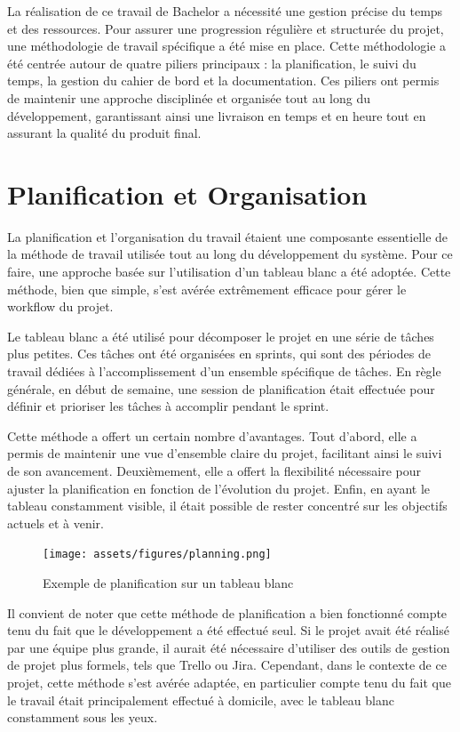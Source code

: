 La réalisation de ce travail de Bachelor a nécessité une gestion précise du temps et des ressources. Pour assurer une progression régulière et structurée du projet, une méthodologie de travail spécifique a été mise en place. Cette méthodologie a été centrée autour de quatre piliers principaux : la planification, le suivi du temps, la gestion du cahier de bord et la documentation. Ces piliers ont permis de maintenir une approche disciplinée et organisée tout au long du développement, garantissant ainsi une livraison en temps et en heure tout en assurant la qualité du produit final.

\section{Planification et Organisation}

La planification et l'organisation du travail étaient une composante essentielle de la méthode de travail utilisée tout au long du développement du système. Pour ce faire, une approche basée sur l'utilisation d'un tableau blanc a été adoptée. Cette méthode, bien que simple, s'est avérée extrêmement efficace pour gérer le workflow du projet.

Le tableau blanc a été utilisé pour décomposer le projet en une série de tâches plus petites. Ces tâches ont été organisées en sprints, qui sont des périodes de travail dédiées à l'accomplissement d'un ensemble spécifique de tâches. En règle générale, en début de semaine, une session de planification était effectuée pour définir et prioriser les tâches à accomplir pendant le sprint.

Cette méthode a offert un certain nombre d'avantages. Tout d'abord, elle a permis de maintenir une vue d'ensemble claire du projet, facilitant ainsi le suivi de son avancement. Deuxièmement, elle a offert la flexibilité nécessaire pour ajuster la planification en fonction de l'évolution du projet. Enfin, en ayant le tableau constamment visible, il était possible de rester concentré sur les objectifs actuels et à venir.

\begin{figure}[H]
    \centering
    \texttt{[image: assets/figures/planning.png]}
    \caption{Exemple de planification sur un tableau blanc}
\end{figure}

Il convient de noter que cette méthode de planification a bien fonctionné compte tenu du fait que le développement a été effectué seul. Si le projet avait été réalisé par une équipe plus grande, il aurait été nécessaire d'utiliser des outils de gestion de projet plus formels, tels que Trello ou Jira. Cependant, dans le contexte de ce projet, cette méthode s'est avérée adaptée, en particulier compte tenu du fait que le travail était principalement effectué à domicile, avec le tableau blanc constamment sous les yeux.


